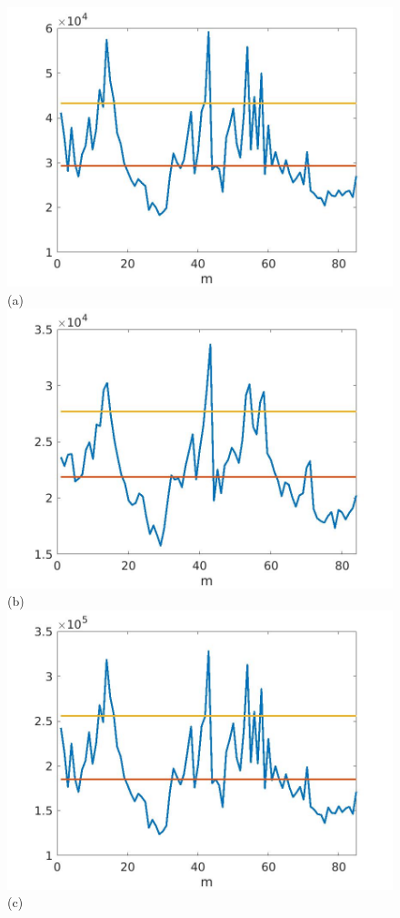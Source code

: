 \documentclass[journal]{IEEEtran}
\begin{document}
\begin{figure}[htp!]
\includegraphics[scale=.12]{../../figs/J1_VV_squared_meandev}(a)
\includegraphics[scale=.12]{../../figs/consecdif_J1_VV_squared_meandev}(b)\\
\includegraphics[scale=.12]{../../figs/J2_VV_squared_meandev}(c)

\end{figure}
\end{document}
